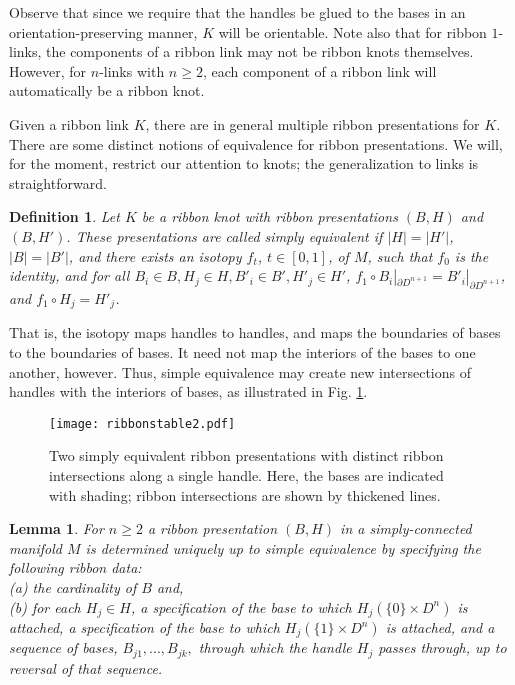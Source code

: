 \documentclass{amsart}
\newtheorem{lemma}[theorem]{Lemma}
\newtheorem{definition}[theorem]{Definition}
\begin{document}
Observe that since we require that the handles be glued to the bases in an orientation-preserving manner, $K$ will be orientable. Note also that for ribbon $1$-links, the components of a ribbon link may not be ribbon knots themselves. However, for $n$-links with $n\geq 2$, each component of a ribbon link will automatically be a ribbon knot.

Given a ribbon link $K$, there are in general multiple ribbon presentations for $K$. There are some distinct notions of equivalence for ribbon presentations. We will, for the moment, restrict our attention to knots; the generalization to links is straightforward. 

\begin{definition}
Let $K$ be a ribbon knot with ribbon presentations $(B, H)$ and $(B, H')$. These presentations are called \emph{simply equivalent} if $|H|=|H'|$, $|B|=|B'|$, and there exists an isotopy $f_t$, $t\in [0,1]$, of $M$, such that $f_0$ is the identity, and for all $B_i\in B, H_j\in H, B'_i\in B', H'_j\in H'$, $f_1\circ B_i|_{\partial D^{n+1}}=B'_i|_{\partial D^{n+1}}$, and $f_1\circ H_j=H'_j$.

\end{definition}

That is, the isotopy maps handles to handles, and maps the boundaries of bases to the boundaries of bases. It need not map the interiors of the bases to one another, however. Thus, simple equivalence may create new intersections of handles with the interiors of bases, as illustrated in Fig. \ref{ribbonstable2}.

\begin{figure}
		\centering
			\texttt{[image: ribbonstable2.pdf]}
		\caption{Two simply equivalent ribbon presentations with distinct ribbon intersections along a single handle. Here, the bases are indicated with shading; ribbon intersections are shown by thickened lines.}
		\label{ribbonstable2}
\end{figure}

\begin{lemma}
For $n\geq 2$ a ribbon presentation $(B,H)$ in a simply-connected manifold $M$ is determined uniquely up to simple equivalence by specifying the following ribbon data:\\
(a) the cardinality of $B$ and,\\
(b) for each $H_{j}\in H$, a specification of the base to which $H_j (\{ 0 \} \times D^n)$ is attached, a specification of the base to which $H_j (\{ 1 \} \times D^n)$ is attached, and a sequence of bases, $B_{j1},...,B_{jk},$
through which the handle $H_j$ passes through, up to reversal of that sequence.
\end{lemma}
\end{document}
